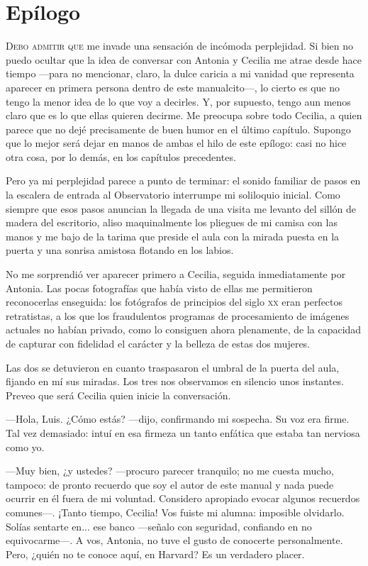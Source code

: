 \chapter{Epílogo}
\label{sec:epilogo}

\lettrine[lines=2]{D}{ebo admitir que} me invade una sensación de
incómoda perplejidad. Si bien no puedo ocultar que la idea de
conversar con Antonia y Cecilia me atrae desde hace tiempo ---para no
mencionar, claro, la dulce caricia a mi vanidad que representa
aparecer en primera persona dentro de este manualcito---, lo cierto es
que no tengo la menor idea de lo que voy a decirles. Y, por supuesto,
tengo aun menos claro que es lo que ellas quieren decirme. Me preocupa
sobre todo Cecilia, a quien parece que no dejé precisamente de buen
humor en el último capítulo. Supongo que lo mejor será dejar en manos
de ambas el hilo de este epílogo: casi no hice otra cosa, por lo
demás, en los capítulos precedentes.

Pero ya mi perplejidad parece a punto de terminar: el sonido familiar
de pasos en la escalera de entrada al Observatorio interrumpe mi
soliloquio inicial. Como siempre que esos pasos anuncian la llegada de
una visita me levanto del sillón de madera del escritorio, aliso
maquinalmente los pliegues de mi camisa con las manos y me bajo de la
tarima que preside el aula con la mirada puesta en la puerta y una
sonrisa amistosa flotando en los labios.

No me sorprendió ver aparecer primero a Cecilia, seguida
inmediatamente por Antonia. Las pocas fotografías que había visto de
ellas me permitieron reconocerlas enseguida: los fotógrafos de
principios del siglo \textsc{xx} eran perfectos retratistas, a los que los
fraudulentos programas de procesamiento de imágenes actuales no habían
privado, como lo consiguen ahora plenamente, de la capacidad de
capturar con fidelidad el carácter y la belleza de estas dos mujeres.

Las dos se detuvieron en cuanto traspasaron el umbral de la puerta del
aula, fijando en mí sus miradas. Los tres nos observamos en silencio
unos instantes. Preveo que será Cecilia quien inicie la conversación.

---Hola, Luis. ¿Cómo estás? ---dijo, confirmando mi sospecha. Su voz
era firme. Tal vez demasiado: intuí en esa firmeza un tanto enfática
que estaba tan nerviosa como yo.

---Muy bien, ¿y ustedes? ---procuro parecer tranquilo; no me cuesta
mucho, tampoco: de pronto recuerdo que soy el autor de este manual y
nada puede ocurrir en él fuera de mi voluntad. Considero apropiado
evocar algunos recuerdos comunes---. ¡Tanto tiempo, Cecilia!  Vos
fuiste mi alumna: imposible olvidarlo. Solías sentarte en... ese banco
---señalo con seguridad, confiando en no equivocarme---.  A vos,
Antonia, no tuve el gusto de conocerte personalmente. Pero, ¿quién no
te conoce aquí, en Harvard? Es un verdadero placer.

